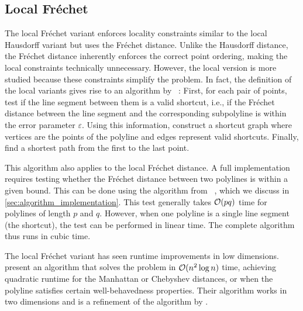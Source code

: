 \subsection{Local Fréchet}
The local Fréchet variant enforces locality constraints similar to the local Hausdorff variant but uses the Fréchet distance. Unlike the Hausdorff distance, the Fréchet distance inherently enforces the correct point ordering, making the local constraints technically unnecessary. However, the local version is more studied because these constraints simplify the problem. In fact, the definition of the local variants gives rise to an algorithm by \citeauthor{computational_geometric_methods_for_polygonal_approximations_of_a_curve}~\cite{computational_geometric_methods_for_polygonal_approximations_of_a_curve}: First, for each pair of points, test if the line segment between them is a valid shortcut, i.e., if the Fréchet distance between the line segment and the corresponding subpolyline is within the error parameter \(\varepsilon\). Using this information, construct a shortcut graph where vertices are the points of the polyline and edges represent valid shortcuts. Finally, find a shortest path from the first to the last point.

This algorithm also applies to the local Fréchet distance. A full implementation requires testing whether the Fréchet distance between two polylines is within a given bound. This can be done using the algorithm from \citeauthor{computing_the_frechet_distance_between_two_polygonal_curves}~\cite{computing_the_frechet_distance_between_two_polygonal_curves}, which we discuss in \cref{sec:algorithm_implementation}. This test generally takes \(\mathcal{O}(pq)\) time for polylines of length \(p\) and \(q\). However, when one polyline is a single line segment (the shortcut), the test can be performed in linear time. The complete algorithm thus runs in cubic time.

The local Fréchet variant has seen runtime improvements in low dimensions. ~\cite{polyline_simplification_under_the_local_frechet_distance_has_almost_quadratic_runtime_in_2d_storandtetal} present an algorithm that solves the problem in \(\mathcal{O}(n^2 \log n)\) time, achieving quadratic runtime for the Manhattan or Chebyshev distances, or when the polyline satisfies certain well-behavedness properties. Their algorithm works in two dimensions and is a refinement of the algorithm by \citeauthor{computing_the_frechet_distance_between_two_polygonal_curves}.

